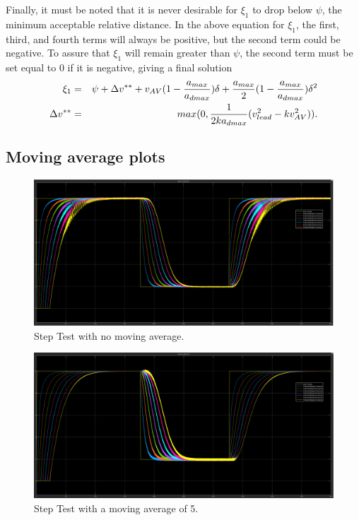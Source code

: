 \documentclass[conference]{IEEEtran}
\begin{document}
\begin{appendix}
Finally, it must be noted that it is never desirable for $\xi_1$ to drop below $\psi$, the minimum acceptable relative distance. In the above equation for $\xi_1$, the first, third, and fourth terms will always be positive, but the second term could be negative. To assure that $\xi_1$ will remain greater than $\psi$, the second term must be set equal to 0 if it is negative, giving a final solution
\begin{eqnarray*}
\xi_1 &=& \psi+\Delta v^{**}+v_{AV}(1-{a_{max}\over a_{dmax}})\delta+{a_{max}\over 2}(1-{a_{max}\over a_{dmax}})\delta^2 \\
\Delta v^{**} &=& max(0,{1\over 2ka_{dmax}}(v_{lead}^2-kv_{AV}^2)).
\end{eqnarray*}


\pagebreak
\subsection{Moving average plots}
\begin{figure}[htbp!]
\centerline{\includegraphics[width=6.50 in]{multiFS_velbad_ma1.png}}
\caption{Step Test with no moving average.}
\label{ma1}
\end{figure}

\begin{figure}[htbp!]
\centerline{\includegraphics[width=6.50 in]{multiFS_velbad_ma5.png}}
\caption{Step Test with a moving average of 5.}
\label{ma5}
\end{figure}


\end{appendix}
\end{document}
